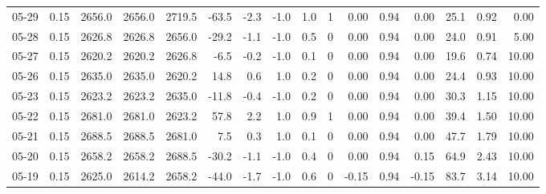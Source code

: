 \begin{threeparttable}
{\begin{tabular}{lrrrrrrrrrrrrrrr}
  05-29 &     0.15 & 2656.0 & 2656.0 & 2719.5 &      -63.5 &           -2.3 &                     -1.0 &                 1.0 &              1 &       0.00 &      0.94 &           0.00 &             25.1 &            0.92 &                   0.00 \\
  05-28 &     0.15 & 2626.8 & 2626.8 & 2656.0 &      -29.2 &           -1.1 &                     -1.0 &                 0.5 &              0 &       0.00 &      0.94 &           0.00 &             24.0 &            0.91 &                   5.00 \\
  05-27 &     0.15 & 2620.2 & 2620.2 & 2626.8 &       -6.5 &           -0.2 &                     -1.0 &                 0.1 &              0 &       0.00 &      0.94 &           0.00 &             19.6 &            0.74 &                  10.00 \\
  05-26 &     0.15 & 2635.0 & 2635.0 & 2620.2 &       14.8 &            0.6 &                      1.0 &                 0.2 &              0 &       0.00 &      0.94 &           0.00 &             24.4 &            0.93 &                  10.00 \\
  05-23 &     0.15 & 2623.2 & 2623.2 & 2635.0 &      -11.8 &           -0.4 &                     -1.0 &                 0.2 &              0 &       0.00 &      0.94 &           0.00 &             30.3 &            1.15 &                  10.00 \\
  05-22 &     0.15 & 2681.0 & 2681.0 & 2623.2 &       57.8 &            2.2 &                      1.0 &                 0.9 &              1 &       0.00 &      0.94 &           0.00 &             39.4 &            1.50 &                  10.00 \\
  05-21 &     0.15 & 2688.5 & 2688.5 & 2681.0 &        7.5 &            0.3 &                      1.0 &                 0.1 &              0 &       0.00 &      0.94 &           0.00 &             47.7 &            1.79 &                  10.00 \\
  05-20 &     0.15 & 2658.2 & 2658.2 & 2688.5 &      -30.2 &           -1.1 &                     -1.0 &                 0.4 &              0 &       0.00 &      0.94 &           0.15 &             64.9 &            2.43 &                  10.00 \\
  05-19 &     0.15 & 2625.0 & 2614.2 & 2658.2 &      -44.0 &           -1.7 &                     -1.0 &                 0.6 &              0 &      -0.15 &      0.94 &          -0.15 &             83.7 &            3.14 &                  10.00 \\

\end{tabular}}
\end{threeparttable}
